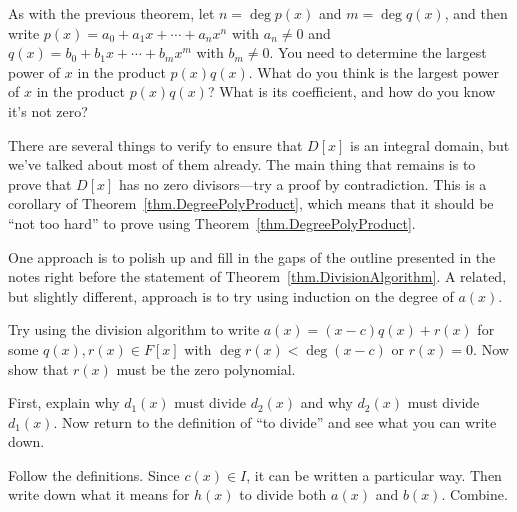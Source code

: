\begin{hint*}
As with the previous theorem, let $n = \deg p(x)$ and $m = \deg q(x)$, and then write $p(x) = a_0 + a_1x + \cdots + a_nx^n$ with $a_n\neq 0$ and $q(x) = b_0 + b_1x + \cdots + b_mx^m$ with $b_m\neq 0$. You need to determine the largest power of $x$ in the product $p(x)q(x)$. What do you think is the largest power of $x$ in the product $p(x)q(x)$? What is its coefficient, and how do you know it's not zero?
\end{hint*}

\begin{hint*}
There are several things to verify to ensure that $D[x]$ is an integral domain, but we've talked about most of them already. The main thing that remains is to prove that $D[x]$ has no zero divisors---try a proof by contradiction. This is a corollary of Theorem~\ref{thm.DegreePolyProduct}, which means that it should be ``not too hard'' to prove using Theorem~\ref{thm.DegreePolyProduct}. 
\end{hint*}

\begin{hint*}
One approach is to polish up and fill in the gaps of the outline presented in the notes right before the statement of Theorem~\ref{thm.DivisionAlgorithm}. A related, but slightly different, approach is to try using induction on the degree of $a(x)$.
\end{hint*}

\begin{hint*}
Try  using the division algorithm to write $a(x) = (x-c)q(x) + r(x)$ for some $q(x),r(x)\in F[x]$ with $\deg r(x) < \deg (x-c)$ or $r(x) = 0$. Now show that $r(x)$ must be the zero polynomial.
\end{hint*}

\begin{hint*}
First, explain why $d_1(x)$ must divide $d_2(x)$ and why $d_2(x)$ must divide $d_1(x)$. Now return to the definition of ``to divide'' and see what you can write down.
\end{hint*}

\begin{hint*}
Follow the definitions. Since $c(x)\in I$, it can be written a particular way. Then write down what it means for $h(x)$ to divide both $a(x)$ and $b(x)$. Combine.
\end{hint*}

